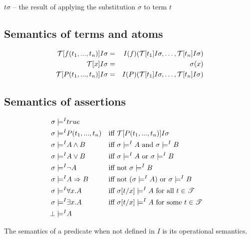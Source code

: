 $t \sigma$ -- the result of applying the substitution $\sigma$ to term $t$


\subsection{Semantics of terms and atoms}


\begin{eqnarray*}
 \mathcal{T} [ f(t_1,...,t_n) ] I \sigma& =& 
I(f)( \mathcal{T} [ t_1 ] I \sigma, \ldots,  \mathcal{T} [ t_n ] I \sigma)
\\
 \mathcal{T} [ x ] I \sigma& =& \sigma(x)
\\
 \mathcal{T} [ P(t_1,...,t_n) ] I \sigma& =& 
I(P)( \mathcal{T} [ t_1 ] I \sigma, \ldots,  \mathcal{T} [ t_n ] I \sigma)
\end{eqnarray*}



\subsection{Semantics of assertions}


\begin{align*}
 \sigma \models^{I} &true
 \\
 \sigma \models^{I} &P(t_1,...,t_n)
 && \text{iff }  \mathcal{T} [ P(t_1,...,t_n) ] I \sigma
\\
 \sigma \models^{I} &A \wedge B
 &&\text{iff }  \sigma \models^{I} A \text{ and }  \sigma \models^{I} B
\\
 \sigma \models^{I} &A \vee B
 &&\text{iff }  \sigma \models^{I} A \text{ or }  \sigma \models^{I} B
\\
 \sigma \models^{I} &\neg A 
 &&\text{iff } \text{not }  \sigma \models^{I} B
\\
 \sigma \models^{I} &A \Rightarrow B
 &&\text{iff not }(  \sigma \models^{I} A )\text{ or }  \sigma \models^{I} B
\\
 \sigma \models^{I} &\forall x. A
 &&\text{iff }  \sigma[t/x] \models^{I} A \text{ for all } t \in  \mathscr{T} 
\\
 \sigma \models^{I} &\exists x. A
 &&\text{iff }  \sigma[t/x] \models^{I} A \text{ for some } t \in  \mathscr{T} 
\\
 \bot \models^{I} &A
 &&
\end{align*}

The semantics of a predicate when not defined in $I$ is its operational
semantics.


